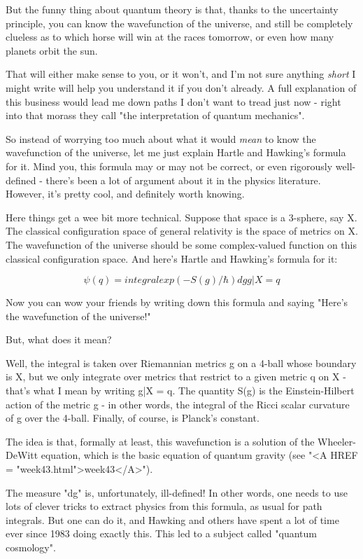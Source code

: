 But the funny thing about quantum theory is that, thanks to the
uncertainty principle, you can know the wavefunction of the universe,
and still be completely clueless as to which horse will win at the
races tomorrow, or even how many planets orbit the sun.  

That will either make sense to you, or it won't, and I'm not sure
anything \emph{short} I might write will help you understand it if you 
don't already.  A full explanation of this business would lead me 
down paths I don't want to tread just now - right into that morass
they call "the interpretation of quantum mechanics".

So instead of worrying too much about what it would \emph{mean} to know the
wavefunction of the universe, let me just explain Hartle and Hawking's
formula for it.  Mind you, this formula may or may not be correct, or 
even rigorously well-defined - there's been a lot of argument about it 
in the physics literature.  However, it's pretty cool, and definitely
worth knowing. 

Here things get a wee bit more technical.  Suppose that space is a 
3-sphere, say X.  The classical configuration space of general relativity 
is the space of metrics on X.  The wavefunction of the universe should 
be some complex-valued function on this classical configuration space.  
And here's Hartle and Hawking's formula for it:

$$
              \psi (q) = integral exp(-S(g)/\hbar ) dg
                       g|X = q

$$
    
Now you can wow your friends by writing down this formula and
saying "Here's the wavefunction of the universe!"  

But, what does it mean? 

Well, the integral is taken over Riemannian metrics g on a 4-ball
whose boundary is X, but we only integrate over metrics that
restrict to a given metric q on X - that's what I mean by writing
g|X = q.  The quantity S(g) is the Einstein-Hilbert action of the 
metric g - in other words, the integral of the Ricci scalar curvature
of g over the 4-ball.  Finally, of course, \hbar  is Planck's constant.

The idea is that, formally at least, this wavefunction is a solution of
the Wheeler-DeWitt equation, which is the basic equation of quantum
gravity (see "<A HREF = "week43.html">week43</A>").

The measure "dg" is, unfortunately, ill-defined!  In other words, one
needs to use lots of clever tricks to extract physics from this formula, 
as usual for path integrals.  But one can do it, and Hawking and others 
have spent a lot of time ever since 1983 doing exactly this.  This led 
to a subject called "quantum cosmology".

